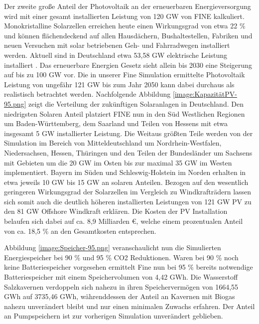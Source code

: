 Der zweite große Anteil der Photovoltaik an der erneuerbaren Energieversorgung wird mit einer gesamt installierten Leistung von 120 GW von FINE kalkuliert. Monokristalline Solarzellen erreichen heute einen Wirkungsgrad von etwa 22 \% \cite{ag_2021} und können flächendeckend auf allen Hausdächern, Bushaltestellen, Fabriken und neuen Versuchen mit solar betriebenen Geh- und Fahrradwegen installiert werden. 
Aktuell sind in Deutschland etwa 53,58 GW elektrische Leistung installiert \cite{ag_2021}. Das erneuerbare Energien Gesetz sieht allein bis 2030 eine Steigerung auf bis zu 100 GW vor. \cite{ag_2021} Die in unserer Fine Simulation ermittelte Photovoltaik Leistung von ungefähr 121 GW bis zum Jahr 2050 kann dabei durchaus als realistisch betrachtet werden. Nachfolgende Abbildung \ref{image:KapazitätPV-95.png} zeigt die Verteilung der zukünftigen Solaranlagen in Deutschland. 
Den niedrigsten Solaren Anteil platziert FINE nun in den Süd Westlichen Regionen um Baden-Württemberg, dem Saarland und Teilen von Hessens mit etwa insgesamt 5 GW installierter Leistung. Die Weitaus größten Teile werden von der Simulation im Bereich von Mitteldeutschland um Nordrhein-Westfalen, Niedersachsen, Hessen, Thüringen und den Teilen der Bundesländer um Sachsens mit Gebieten um die 20 GW im Osten bis zur maximal 35 GW im Westen implementiert. 
Bayern im Süden und Schleswig-Holstein im Norden erhalten in etwa jeweils 10 GW bis 15 GW an solaren Anteilen. Bezogen auf den wesentlich geringeren Wirkungsgrad der Solarzellen im Vergleich zu Windkrafträdern lassen sich somit auch die deutlich höheren installierten Leistungen von 121 GW PV zu den 81 GW Offshore Windkraft erklären. Die Kosten der PV Installation belaufen sich dabei auf ca. 8,9 Milliarden €, welche einem prozentualen Anteil von ca. 18,5  \% an den Gesamtkosten entsprechen.



Abbildung \ref{image:Speicher-95.png} veranschaulicht nun die Simulierten Energiespeicher bei 90 \% und 95 \% CO2 Reduktionen. Waren bei 90 \% noch keine Batteriespeicher vorgesehen ermittelt Fine nun bei 95 \% bereits notwendige Batteriespeicher mit einem Speichervolumen von 4,42 GWh. Die Wasserstoff Salzkavernen verdoppeln sich nahezu in ihren Speichervermögen von 1664,55 GWh auf 3735,46 GWh, währenddessen der Anteil an Kavernen mit Biogas nahezu unverändert bleibt und nur einen minimalen Zuwachs erfahren. Der Anteil an Pumpspeichern ist zur vorherigen Simulation unverändert geblieben. 

